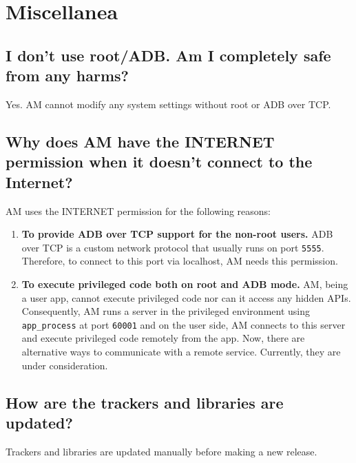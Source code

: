 \section{Miscellanea}\label{sec:faq:miscellanea} %

\subsection{I don't use root/ADB. Am I completely safe from any harms?} %
Yes. AM cannot modify any system settings without root or ADB over TCP\@.

\subsection{Why does AM have the INTERNET permission when it doesn't connect to the Internet?} %
AM uses the INTERNET permission for the following reasons:
\begin{enumerate}
    \item \textbf{To provide ADB over TCP support for the non-root users.} ADB over TCP is a custom network protocol
    that usually runs on port \texttt{5555}. Therefore, to connect to this port via localhost, AM needs this permission.
    \item \textbf{To execute privileged code both on root and ADB mode.} AM, being a user app, cannot execute privileged
    code nor can it access any hidden APIs. Consequently, AM runs a server in the privileged environment using
    \texttt{app\_process} at port \texttt{60001} and on the user side, AM connects to this server and execute privileged
    code remotely from the app. Now, there are alternative ways to communicate with a remote service. Currently, they
    are under consideration.
\end{enumerate}

\subsection{How are the trackers and libraries are updated?} %
Trackers and libraries are updated manually before making a new release.

